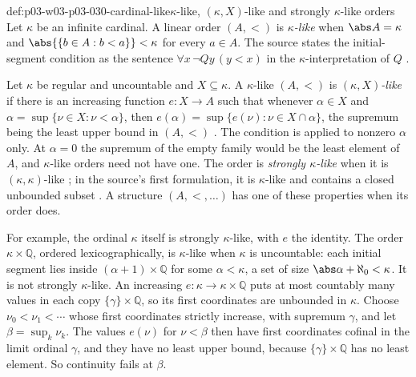\begin{hbdefinition}{def:p03-w03-p03-030-cardinal-like}{\(\kappa\)-like, \((\kappa,X)\)-like and strongly \(\kappa\)-like orders}
Let \(\kappa\) be an infinite cardinal.  A linear order \((A,<)\) is
\emph{\(\kappa\)-like} when \(\abs A=\kappa\) and
\(\abs{\{b\in A:b<a\}}<\kappa\) for every \(a\in A\).  The source states the
initial-segment condition as the sentence \(\forall x\,\neg Qy\,(y<x)\) in
the \(\kappa\)-interpretation of \(Q\)
\cite[Definition~1.2.1, p.~179]{Schmerl1985TransferTheorems}.

Let \(\kappa\) be regular and uncountable and \(X\subseteq\kappa\).  A
\(\kappa\)-like \((A,<)\) is \emph{\((\kappa,X)\)-like} if there is an
increasing function \(e:X\to A\) such that whenever \(\alpha\in X\) and
\(\alpha=\sup\{\nu\in X:\nu<\alpha\}\), then
\(e(\alpha)=\sup\{e(\nu):\nu\in X\cap\alpha\}\), the supremum being the least
upper bound in \((A,<)\)
\cite[Definition~6.1.4, p.~204]{Schmerl1985TransferTheorems}.  The condition
is applied to nonzero \(\alpha\) only.  At \(\alpha=0\) the supremum of the
empty family would be the least element of \(A\), and \(\kappa\)-like orders
need not have one.  The order is
\emph{strongly \(\kappa\)-like} when it is \((\kappa,\kappa)\)-like
\cite[p.~204]{Schmerl1985TransferTheorems}; in the source's first
formulation, it is \(\kappa\)-like and contains a closed unbounded subset
\cite[Definition~5.2.1, p.~200]{Schmerl1985TransferTheorems}.  A structure
\((A,<,\ldots)\) has one of these properties when its order does.
\end{hbdefinition}

For example, the ordinal \(\kappa\) itself is strongly \(\kappa\)-like, with
\(e\) the identity.  The order \(\kappa\times\mathbb Q\), ordered
lexicographically, is \(\kappa\)-like when \(\kappa\) is uncountable: each
initial segment lies inside \((\alpha+1)\times\mathbb Q\) for some
\(\alpha<\kappa\), a set of size \(\abs\alpha+\aleph_0<\kappa\).  It is not
strongly \(\kappa\)-like.  An increasing \(e:\kappa\to\kappa\times\mathbb Q\)
puts at most countably many values in each copy \(\{\gamma\}\times\mathbb Q\),
so its first coordinates are unbounded in \(\kappa\).  Choose
\(\nu_0<\nu_1<\cdots\) whose first coordinates strictly increase, with
supremum \(\gamma\), and let \(\beta=\sup_k\nu_k\).  The values \(e(\nu)\)
for \(\nu<\beta\) then have first coordinates cofinal in the limit ordinal
\(\gamma\), and they have no least upper bound, because
\(\{\gamma\}\times\mathbb Q\) has no least element.  So continuity fails at
\(\beta\).

